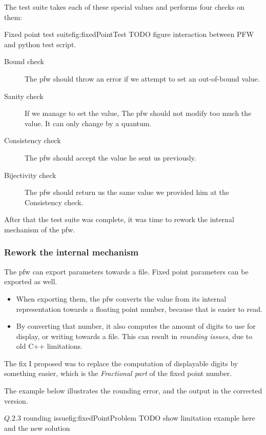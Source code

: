 The test suite takes each of these special values and performs four checks on
them:

\begin{figureGraphics}{Fixed point test suite}{fig:fixedPointTest}
    TODO figure interaction between PFW and \gls{python} test script.
\end{figureGraphics}

\begin{description}
    \item[Bound check] The \gls{pfw} should throw an error if we
        attempt to set an out-of-bound value.
    \item[Sanity check] If we manage to set the value, The \gls{pfw} should not modify too much
        the value. It can only change by a quantum.
    \item[Consistency check] The \gls{pfw} should accept the value he sent us previously.
    \item[Bijectivity check] The \gls{pfw} should return us the same value we provided him at the Consistency check.
\end{description}

After that the test suite was complete, it was time to rework the internal
mechanism of the \gls{pfw}.

\subsubsection{Rework the internal mechanism}
The \gls{pfw} can export parameters towards a file. Fixed
point parameters can be exported as well.
\begin{itemize}
    \item When exporting them, the \gls{pfw} converts the value from
        its internal representation towards a floating point number, because that is
        easier to read.
    \item By converting that number, it also computes the amount of digits
        to use for display, or writing towards a file. This can result in
        \emph{rounding issues}, due to old C++ limitations.
\end{itemize}
The fix I proposed was to replace the computation of displayable digits by something
easier, which is the \emph{Fractional part} of the fixed point number.

The example below illustrates the rounding error, and the output in the corrected version.
\begin{figureGraphics}{$Q.2.3$ rounding issue}{fig:fixedPointProblem}
    TODO show limitation example here and the new solution\\
\end{figureGraphics}


